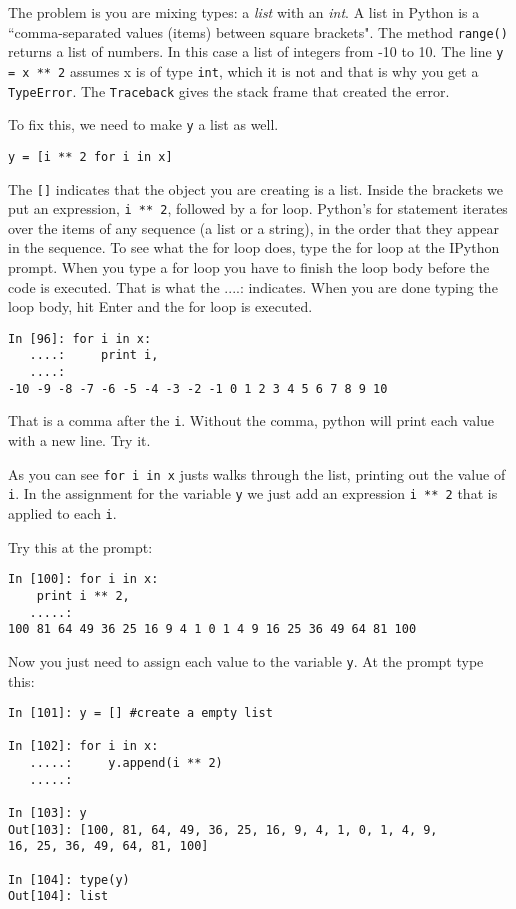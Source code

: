 \documentclass[12pt]{article}
\begin{document}
The problem is you are mixing types: a \emph{list} with an \emph{int}. A list in Python is a ``comma-separated values (items) between square brackets". The method \texttt{range()} returns a list of numbers. In this case a list of integers from -10 to 10. The line \texttt{y = x ** 2} assumes x is of type \texttt{int}, which it is not and that is why you get a \texttt{TypeError}. The \texttt{Traceback} gives the stack frame that created the error.

To fix this, we need to make \texttt{y} a list as well. 

\begin{lstlisting}[style=bash]
y = [i ** 2 for i in x]
\end{lstlisting}

The \texttt{[]} indicates that the object you are creating is a list. Inside the brackets we put an expression, \texttt{i ** 2}, followed by a for loop. Python's for statement iterates over the items of any sequence (a list or a string), in the order that they appear in the sequence. To see what the for loop does, type the for loop at the IPython prompt. When you type a for loop you have to finish the loop body before the code is executed. That is what the ....: indicates. When you are done typing the loop body, hit Enter and the for loop is executed.

\begin{lstlisting}[style=bash]
In [96]: for i in x: 
   ....:     print i,
   ....:     
-10 -9 -8 -7 -6 -5 -4 -3 -2 -1 0 1 2 3 4 5 6 7 8 9 10
\end{lstlisting}

That is a comma after the \texttt{i}. Without the comma, python will print each value with a new line. Try it. 

As you can see \texttt{for i in x} justs walks through the list, printing out the value of \texttt{i}. In the assignment for the variable \texttt{y} we just add an expression \texttt{i ** 2} that is applied to each \texttt{i}.

Try this at the prompt:

\begin{lstlisting}[style=bash]
In [100]: for i in x:
    print i ** 2,
   .....:     
100 81 64 49 36 25 16 9 4 1 0 1 4 9 16 25 36 49 64 81 100
\end{lstlisting}

Now you just need to assign each value to the variable \texttt{y}. At the prompt type this:

\begin{lstlisting}[style=bash]
In [101]: y = [] #create a empty list

In [102]: for i in x:
   .....:     y.append(i ** 2)
   .....:     

In [103]: y
Out[103]: [100, 81, 64, 49, 36, 25, 16, 9, 4, 1, 0, 1, 4, 9, 
16, 25, 36, 49, 64, 81, 100]

In [104]: type(y)
Out[104]: list
\end{lstlisting}
\end{document}
